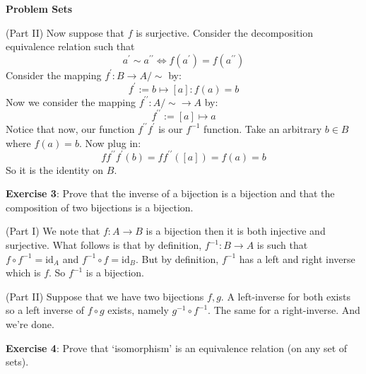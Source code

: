 \documentclass{report}
\begin{document}
\begin{exercises}{\textbf{Problem Sets}}
\begin{answer}
        (Part II) Now suppose that $f$ is surjective. Consider the decomposition equivalence relation such that 
            \begin{equation*}
                a^{\prime} \sim a^{\prime\prime} \iff f(a^{\prime}) = f(a^{\prime\prime})
            \end{equation*}
        Consider the mapping $f^{\prime} : B \rightarrow A/\sim $ by:
            \begin{equation*}
                f^{\prime} := b \mapsto [a] : f(a) = b
            \end{equation*}
        Now we consider the mapping $f^{\prime\prime} : A/\sim \rightarrow A$ by:
            \begin{equation*}
                f^{\prime\prime} := [a] \mapsto a
            \end{equation*}
        Notice that now, our function $f^{\prime\prime}f^{\prime}$ is our $f^{-1}$ function. Take an arbitrary $b \in B$ where $f(a) = b$. Now plug in:
            \begin{equation*}
                ff^{\prime\prime}f^{\prime}(b) = ff^{\prime\prime}([a]) = f(a) = b
            \end{equation*}
        So it is the identity on $B$.
    \end{answer}

    \textbf{Exercise 3}: Prove that the inverse of a bijection is a bijection and that the composition of two bijections is a bijection.

    \begin{answer}
        (Part I) We note that $f : A \rightarrow B$ is a bijection then it is both injective and surjective. What follows is that by definition, $f^{-1}: B \rightarrow A$ is such that $f \circ f^{-1} = \text{id}_{A}$ and $f^{-1} \circ f = \text{id}_{B}$. But by definition, $f^{-1}$ has a left and right inverse which is $f$. So $f^{-1}$ is a bijection. 

        (Part II) Suppose that we have two bijections $f, g$. A left-inverse for both exists so a left inverse of $f \circ g$ exists, namely $g^{-1} \circ f^{-1}$. The same for a right-inverse. And we're done.
    \end{answer}

    \textbf{Exercise 4}: Prove that `isomorphism' is an equivalence relation (on any set of sets).
 

\end{exercises}
\end{document}
